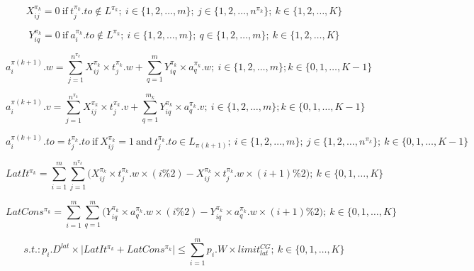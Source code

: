 \documentclass[preprint,authoryear]{elsarticle}
\begin{document}
\begin{equation} \label{eq:pdp12}
	X_{ij}^{\pi_k} = 0 \ \mbox{if} \ t_j^{\pi_k}.to \notin L^{\pi_k}; \ i \in \{1, 2, \ldots, m\}; \ j \in \{1, 2, \ldots, n^{\pi_k}\}; \ k \in \{1,2, \ldots, K\}
\end{equation}

\begin{equation} \label{eq:pdp9}
	Y_{iq}^{\pi_k} = 0 \ \mbox{if} \ a_i^{\pi_k}.to \notin L^{\pi_k}; \ i \in \{1, 2, \ldots, m\}; \ q \in \{1, 2, \ldots, m\}; \ k \in \{ 1, 2, \ldots, K\}
\end{equation}

\begin{equation} \label{eq:cons2}
	a_i^{\pi(k+1)}.w = \sum_{j=1}^{n^{\pi_k}} X_{ij}^{\pi_k} \times t_j^{\pi_k}.w + \sum_{q=1}^{m} Y_{iq}^{\pi_k} \times a_q^{\pi_k}.w;  \ i \in \{1, 2, \ldots, m\}; k \in \{0, 1, \ldots, K-1\}
\end{equation}

\begin{equation} \label{eq:cons3}
	a_i^{\pi(k+1)}.v = \sum_{j=1}^{n^{\pi_k}} X_{ij}^{\pi_k} \times t_j^{\pi_k}.v + \sum_{q=1}^{m_k} Y_{iq}^{\pi_k} \times a_q^{\pi_k}.v;  \ i \in \{1, 2, \ldots, m\}; k \in \{0, 1, \ldots, K-1\}
\end{equation}

\begin{equation} \label{eq:cons5}
	a_i^{\pi(k+1)}.to = t^{\pi_k}_j.to  \ \mbox{if} \ X^{\pi_k}_{ij} = 1  \ \mbox{and} \ t^{\pi_k}_j.to \in L_{\pi(k+1)};  \ i \in \{1, 2, \ldots, m\}; \ j \in \{1, 2, \ldots, n^{\pi_k}\}; \ k \in \{0,1, \ldots, K-1\}
\end{equation}

\begin{equation} \label{eq:LatIt}
	LatIt^{\pi_k} = \sum_{i=1}^{m} \sum_{j=1}^{n^{\pi_k}} \Big ( X_{ij}^{\pi_k} \times t_j^{\pi_k}.w \times (i\%2) - X_{ij}^{\pi_k} \times t_j^{\pi_k}.w \times (i+1)\%2 \Big ); \ k \in \{0, 1, \ldots, K\}
\end{equation}

\begin{equation} \label{eq:LatCons}
	LatCons^{\pi_k} =  \sum_{i=1}^{m} \sum_{q=1}^{m} \Big ( Y_{iq}^{\pi_k} \times a_q^{\pi_k}.w \times (i\%2) - Y_{iq}^{\pi_k} \times a_q^{\pi_k}.w \times (i+1)\%2 \Big ); \ k \in \{0, 1, \ldots, K\}
\end{equation}

\begin{equation} \label{eq:torqlat}
	s.t.: p_i.D^{lat} \times \Big | LatIt^{\pi_k} + LatCons^{\pi_k} \Big | \leq  \sum_{i=1}^{m}p_i.W \times limit^{CG}_{lat}; \ k \in \{0, 1, \ldots, K\}
\end{equation}
\end{document}
